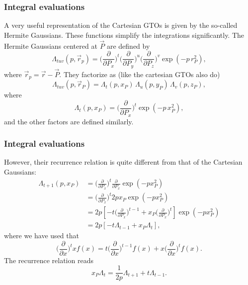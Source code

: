 \frame
{
  \frametitle{Integral evaluations}
\begin{small}
{\scriptsize
A very useful representation of the Cartesian GTOs is given by the so-called Hermite Gaussians. These functions simplify 
the integrations significantly. The Hermite Gaussians centered at $\vec P$ are defined by
\begin{equation}
 \Lambda_{tuv}(p, \vec r_p) = \Big(\frac{\partial}{\partial P_x}\Big)^t \Big(\frac{\partial}{\partial P_y}\Big)^u \Big(\frac{\partial}{\partial P_z}\Big)^v \exp(-p\, r^2_P),
\end{equation}
where $\vec r_p = \vec r - \vec P$. They factorize as (like the cartesian GTOs also do)
\begin{equation}
 \Lambda_{tuv}(p, \vec r_P) = \Lambda_t(p,x_P)\,\Lambda_u(p,y_P)\,\Lambda_v(p,z_P),
\end{equation}
where
\begin{equation}
\label{eq:HermiteGaussian_x}
 \Lambda_t(p,x_P) = \Big(\frac{\partial}{\partial P_x}\Big)^t \exp(-p\,x^2_P),
\end{equation}
and the other factors are defined similarly. 
}
\end{small}
}

\frame
{
  \frametitle{Integral evaluations}
\begin{small}
{\scriptsize
However, their recurrence relation is quite different from that of the Cartesian Gaussians:
\begin{equation}
\begin{split}
 \Lambda_{t+1}(p,x_P) & = \Big(\frac{\partial}{\partial P_x}\Big)^t \frac{\partial}{\partial P_x}\exp(-px^2_P) \\
                      & = \Big(\frac{\partial}{\partial P_x}\Big)^t 2px_P \exp(-px^2_P)  \\
                      & = 2p[-t\Big(\frac{\partial}{\partial P_x}\Big)^{t-1} + x_P \Big(\frac{\partial}{\partial P_x}\Big)^t] \exp(-px^2_P) \\
                      & = 2p[-t\Lambda_{t-1} + x_P \Lambda_t],
\end{split}
\end{equation}
where we have used that
\begin{equation}
\label{eq:derivation_rule}
 \Big(\frac{\partial}{\partial x}\Big)^t x f(x) = t\Big(\frac{\partial}{\partial x}\Big)^{t-1}f(x) + x\Big(\frac{\partial}{\partial x}\Big)^t f(x).
\end{equation}
The recurrence relation reads
\begin{equation}
\label{eq:hermite_gaussian_recurrence}
 x_P \Lambda_t = \frac{1}{2p}\Lambda_{t+1} + t\Lambda_{t-1}.
\end{equation}

}
\end{small}
}


